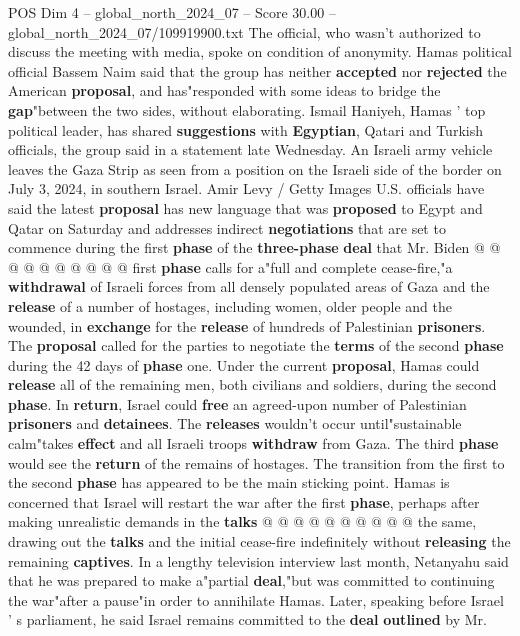 \begin{textsample}{POS Dim 4 – global\_north\_2024\_07 – Score 30.00 – global\_north\_2024\_07/109919900.txt}
The official, who wasn't authorized to discuss the meeting with media, spoke on condition of anonymity.
Hamas political official Bassem Naim said that the group has neither \textbf{accepted} nor \textbf{rejected} the American \textbf{proposal}, and has"responded with some ideas to bridge the \textbf{gap}"between the two sides, without elaborating.
Ismail Haniyeh, Hamas ' top political leader, has shared \textbf{suggestions} with \textbf{Egyptian}, Qatari and Turkish officials, the group said in a statement late Wednesday.
An Israeli army vehicle leaves the Gaza Strip as seen from a position on the Israeli side of the border on July 3, 2024, in southern Israel.
Amir Levy / Getty Images U.S. officials have said the latest \textbf{proposal} has new language that was \textbf{proposed} to Egypt and Qatar on Saturday and addresses indirect \textbf{negotiations} that are set to commence during the first \textbf{phase} of the \textbf{three-phase} \textbf{deal} that Mr.
Biden @ @ @ @ @ @ @ @ @ @ first \textbf{phase} calls for a"full and complete cease-fire,"a \textbf{withdrawal} of Israeli forces from all densely populated areas of Gaza and the \textbf{release} of a number of hostages, including women, older people and the wounded, in \textbf{exchange} for the \textbf{release} of hundreds of Palestinian \textbf{prisoners}.
The \textbf{proposal} called for the parties to negotiate the \textbf{terms} of the second \textbf{phase} during the 42 days of \textbf{phase} one.
Under the current \textbf{proposal}, Hamas could \textbf{release} all of the remaining men, both civilians and soldiers, during the second \textbf{phase}.
In \textbf{return}, Israel could \textbf{free} an agreed-upon number of Palestinian \textbf{prisoners} and \textbf{detainees}.
The \textbf{releases} wouldn't occur until"sustainable calm"takes \textbf{effect} and all Israeli troops \textbf{withdraw} from Gaza.
The third \textbf{phase} would see the \textbf{return} of the remains of hostages.
The transition from the first to the second \textbf{phase} has appeared to be the main sticking point.
Hamas is concerned that Israel will restart the war after the first \textbf{phase}, perhaps after making unrealistic demands in the \textbf{talks} @ @ @ @ @ @ @ @ @ @ the same, drawing out the \textbf{talks} and the initial cease-fire indefinitely without \textbf{releasing} the remaining \textbf{captives}.
In a lengthy television interview last month, Netanyahu said that he was prepared to make a"partial \textbf{deal},"but was committed to continuing the war"after a pause"in order to annihilate Hamas.
Later, speaking before Israel ' s parliament, he said Israel remains committed to the \textbf{deal} \textbf{outlined} by Mr.

\end{textsample}

